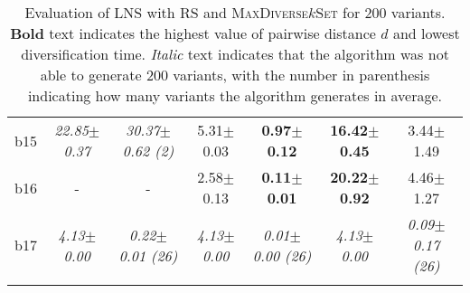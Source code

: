 \begin{longtable}{|l|c|c|c|c|c|c|}
\\
b15&\textit{22.85$\pm$0.37} & \textit{30.37$\pm$0.62 (2)}&5.31$\pm$0.03 & \textbf{0.97$\pm$0.12}&\textbf{16.42$\pm$0.45} & 3.44$\pm$1.49
\\
b16&- & -&2.58$\pm$0.13 & \textbf{0.11$\pm$0.01}&\textbf{20.22$\pm$0.92} & 4.46$\pm$1.27
\\
b17&\textit{4.13$\pm$0.00} & \textit{0.22$\pm$0.01 (26)}&\textit{4.13$\pm$0.00} & \textit{0.01$\pm$0.00 (26)}&\textit{4.13$\pm$0.00} & \textit{0.09$\pm$0.17 (26)}
\\
\hline
\caption{\label{tab:dist_max_rs_lns} Evaluation of \ac{LNS} with \ac{RS} and \textsc{MaxDiverse$k$Set}
		for 200 variants. \textbf{Bold} text indicates the highest value of pairwise distance $d$
		and lowest diversification time. \textit{Italic} text indicates that the algorithm was not able to generate
		200 variants, with the number in parenthesis indicating how many variants the algorithm generates in average.}
\end{longtable}

